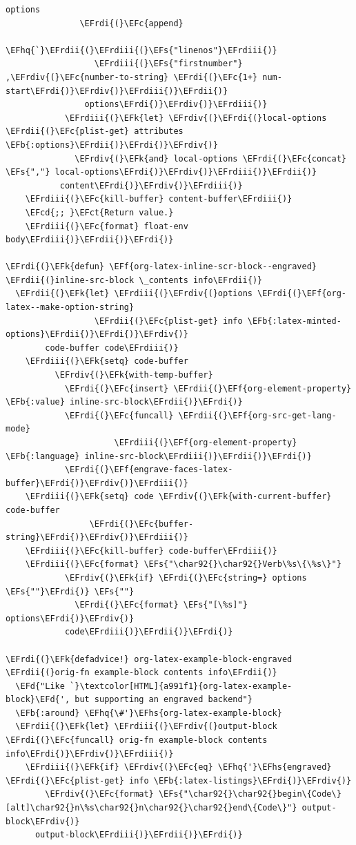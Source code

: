 \documentclass{scrartcl}
\newcommand{\EFk}[1]{\textcolor{EFk}{#1}} %
\newcommand{\EFd}[1]{\textcolor{EFd}{#1}} %
\newcommand{\EFs}[1]{\textcolor{EFs}{#1}} %
\newcommand{\EFb}[1]{\textcolor{EFb}{#1}} %
\newcommand{\EFct}[1]{\textcolor{EFct}{#1}} %
\newcommand{\EFc}[1]{\textcolor{EFc}{#1}} %
\newcommand{\EFf}[1]{\textcolor{EFf}{#1}} %
\newcommand{\EFcd}[1]{\textcolor{EFcd}{#1}} %
\newcommand{\EFhq}[1]{#1} %
\newcommand{\EFhs}[1]{#1} %
\newcommand{\EFrdi}[1]{#1} %
\newcommand{\EFrdii}[1]{#1} %
\newcommand{\EFrdiii}[1]{#1} %
\newcommand{\EFrdiv}[1]{#1} %
\begin{document}
\begin{Code}
\begin{Verbatim}[]
                 options
               \EFrdi{(}\EFc{append}
                \EFhq{`}\EFrdii{(}\EFrdiii{(}\EFs{"linenos"}\EFrdiii{)}
                  \EFrdiii{(}\EFs{"firstnumber"} ,\EFrdiv{(}\EFc{number-to-string} \EFrdi{(}\EFc{1+} num-start\EFrdi{)}\EFrdiv{)}\EFrdiii{)}\EFrdii{)}
                options\EFrdi{)}\EFrdiv{)}\EFrdiii{)}
            \EFrdiii{(}\EFk{let} \EFrdiv{(}\EFrdi{(}local-options \EFrdii{(}\EFc{plist-get} attributes \EFb{:options}\EFrdii{)}\EFrdi{)}\EFrdiv{)}
              \EFrdiv{(}\EFk{and} local-options \EFrdi{(}\EFc{concat} \EFs{","} local-options\EFrdi{)}\EFrdiv{)}\EFrdiii{)}\EFrdii{)}
           content\EFrdi{)}\EFrdiv{)}\EFrdiii{)}
    \EFrdiii{(}\EFc{kill-buffer} content-buffer\EFrdiii{)}
    \EFcd{;; }\EFct{Return value.}
    \EFrdiii{(}\EFc{format} float-env body\EFrdiii{)}\EFrdii{)}\EFrdi{)}

\EFrdi{(}\EFk{defun} \EFf{org-latex-inline-scr-block--engraved} \EFrdii{(}inline-src-block \_contents info\EFrdii{)}
  \EFrdii{(}\EFk{let} \EFrdiii{(}\EFrdiv{(}options \EFrdi{(}\EFf{org-latex--make-option-string}
                  \EFrdii{(}\EFc{plist-get} info \EFb{:latex-minted-options}\EFrdii{)}\EFrdi{)}\EFrdiv{)}
        code-buffer code\EFrdiii{)}
    \EFrdiii{(}\EFk{setq} code-buffer
          \EFrdiv{(}\EFk{with-temp-buffer}
            \EFrdi{(}\EFc{insert} \EFrdii{(}\EFf{org-element-property} \EFb{:value} inline-src-block\EFrdii{)}\EFrdi{)}
            \EFrdi{(}\EFc{funcall} \EFrdii{(}\EFf{org-src-get-lang-mode}
                      \EFrdiii{(}\EFf{org-element-property} \EFb{:language} inline-src-block\EFrdiii{)}\EFrdii{)}\EFrdi{)}
            \EFrdi{(}\EFf{engrave-faces-latex-buffer}\EFrdi{)}\EFrdiv{)}\EFrdiii{)}
    \EFrdiii{(}\EFk{setq} code \EFrdiv{(}\EFk{with-current-buffer} code-buffer
                 \EFrdi{(}\EFc{buffer-string}\EFrdi{)}\EFrdiv{)}\EFrdiii{)}
    \EFrdiii{(}\EFc{kill-buffer} code-buffer\EFrdiii{)}
    \EFrdiii{(}\EFc{format} \EFs{"\char92{}\char92{}Verb\%s\{\%s\}"}
            \EFrdiv{(}\EFk{if} \EFrdi{(}\EFc{string=} options \EFs{""}\EFrdi{)} \EFs{""}
              \EFrdi{(}\EFc{format} \EFs{"[\%s]"} options\EFrdi{)}\EFrdiv{)}
            code\EFrdiii{)}\EFrdii{)}\EFrdi{)}

\EFrdi{(}\EFk{defadvice!} org-latex-example-block-engraved \EFrdii{(}orig-fn example-block contents info\EFrdii{)}
  \EFd{"Like `}\textcolor[HTML]{a991f1}{org-latex-example-block}\EFd{', but supporting an engraved backend"}
  \EFb{:around} \EFhq{\#'}\EFhs{org-latex-example-block}
  \EFrdii{(}\EFk{let} \EFrdiii{(}\EFrdiv{(}output-block \EFrdi{(}\EFc{funcall} orig-fn example-block contents info\EFrdi{)}\EFrdiv{)}\EFrdiii{)}
    \EFrdiii{(}\EFk{if} \EFrdiv{(}\EFc{eq} \EFhq{'}\EFhs{engraved} \EFrdi{(}\EFc{plist-get} info \EFb{:latex-listings}\EFrdi{)}\EFrdiv{)}
        \EFrdiv{(}\EFc{format} \EFs{"\char92{}\char92{}begin\{Code\}[alt]\char92{}n\%s\char92{}n\char92{}\char92{}end\{Code\}"} output-block\EFrdiv{)}
      output-block\EFrdiii{)}\EFrdii{)}\EFrdi{)}
\end{Verbatim}
\end{Code}
\end{document}
